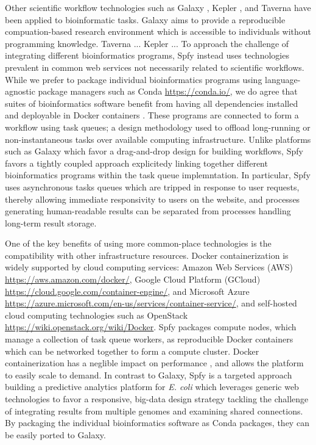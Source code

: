 \documentclass[a4,center,fleqn]{NAR}
\begin{document}
Other scientific workflow technologies such as Galaxy \cite{goecks2010galaxy}, Kepler \cite{ludascher2006scientific}, and Taverna \cite{oinn2004taverna} have been applied to bioinformatic tasks.
Galaxy aims to provide a reproducible compuation-based research environment which is accessible to individuals without programming knowledge.
Taverna ...
Kepler ...
To approach the challenge of integrating different bioinformatics programs, Spfy instead uses technologies prevalent in common web services not necessarily related to scientific workflows.
While we prefer to package individual bioinformatics programs using language-agnostic package managers such as Conda \url{https://conda.io/}, we do agree that suites of bioinformatics software benefit from having all dependencies installed and deployable in Docker containers \cite{di2015impact}.
These programs are connected to form a workflow using task queues; a design methodology used to offload long-running or non-instantaneous tasks over available computing infrastructure.
Unlike platforms such as Galaxy which favor a drag-and-drop design for building workflows, Spfy favors a tightly coupled approach explicitedy linking together different bioinformatics programs within the task queue implemntation.
In particular, Spfy uses asynchronous tasks queues which are tripped in response to user requests, thereby allowing immediate responsivity to users on the website, and processes generating human-readable results can be separated from processes handling long-term result storage.

One of the key benefits of using more common-place technologies is the compatibility with other infrastructure resources.
Docker containerization is widely supported by cloud computing services: Amazon Web Services (AWS) \url{https://aws.amazon.com/docker/}, Google Cloud Platform (GCloud) \url{https://cloud.google.com/container-engine/}, and Microsoft Azure \url{https://azure.microsoft.com/en-us/services/container-service/}, and self-hosted cloud computing technologies such as OpenStack \url{https://wiki.openstack.org/wiki/Docker}.
Spfy packages compute nodes, which manage a collection of task queue workers, as reproducible Docker containers which can be networked together to form a compute cluster.
Docker containerization has a neglible impact on performance \cite{di2015impact}, and allows the platform to easily scale to demand.
In contrast to Galaxy, Spfy is a targeted approach building a predictive analytics platform for \textit{E. coli} which leverages generic web technologies to favor a responsive, big-data design strategy tackling the challenge \cite{fricke2014bacterial} of integrating results from multiple genomes and examining shared connections.
By packaging the individual bioinformatics software as Conda packages, they can be easily ported to Galaxy.
\end{document}
